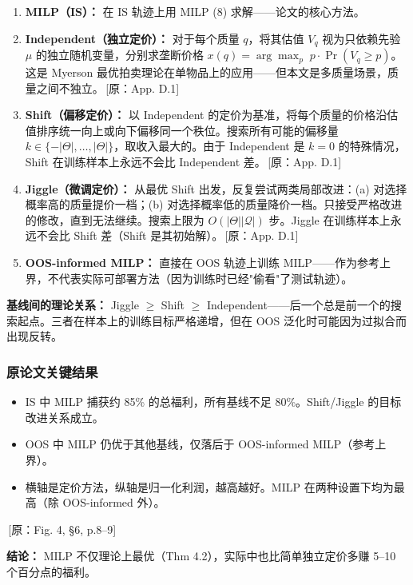 \documentclass[12pt,a4paper]{article}
\newcommand{\srcref}[1]{\textcolor{black!65}{\footnotesize\,[原：#1]}}
\theoremstyle{definition}
\begin{document}
\begin{enumerate}[leftmargin=*]
    \item \textbf{MILP（IS）：} 在 IS 轨迹上用 MILP (8) 求解——论文的核心方法。
    \item \textbf{Independent（独立定价）：} 对于每个质量 $q$，将其估值 $V_q$ 视为只依赖先验 $\mu$ 的独立随机变量，分别求垄断价格 $x(q) = \arg\max_p \; p \cdot \Pr(V_q \ge p)$。这是 Myerson 最优拍卖理论在单物品上的应用——但本文是多质量场景，质量之间不独立。\srcref{App. D.1}
    \item \textbf{Shift（偏移定价）：} 以 Independent 的定价为基准，将每个质量的价格沿估值排序统一向上或向下偏移同一个秩位。搜索所有可能的偏移量 $k \in \{-|\Theta|,\dots,|\Theta|\}$，取收入最大的。由于 Independent 是 $k=0$ 的特殊情况，Shift 在训练样本上永远不会比 Independent 差。\srcref{App. D.1}
    \item \textbf{Jiggle（微调定价）：} 从最优 Shift 出发，反复尝试两类局部改进：(a) 对选择概率高的质量提价一档；(b) 对选择概率低的质量降价一档。只接受严格改进的修改，直到无法继续。搜索上限为 $O(|\Theta||\mathcal{Q}|)$ 步。Jiggle 在训练样本上永远不会比 Shift 差（Shift 是其初始解）。\srcref{App. D.1}
    \item \textbf{OOS-informed MILP：} 直接在 OOS 轨迹上训练 MILP——作为参考上界，不代表实际可部署方法（因为训练时已经"偷看"了测试轨迹）。
\end{enumerate}

\textbf{基线间的理论关系：} Jiggle $\ge$ Shift $\ge$ Independent——后一个总是前一个的搜索起点。三者在样本上的训练目标严格递增，但在 OOS 泛化时可能因为过拟合而出现反转。

\subsubsection{原论文关键结果}

\begin{itemize}[leftmargin=*]
    \item IS 中 MILP 捕获约 85\% 的总福利，所有基线不足 80\%。Shift/Jiggle 的目标改进关系成立。
    \item OOS 中 MILP 仍优于其他基线，仅落后于 OOS-informed MILP（参考上界）。
    \item 横轴是定价方法，纵轴是归一化利润，越高越好。MILP 在两种设置下均为最高（除 OOS-informed 外）。
\end{itemize}
\srcref{Fig. 4, §6, p.8--9}

\textbf{结论：} MILP 不仅理论上最优（Thm 4.2），实际中也比简单独立定价多赚 5--10 个百分点的福利。
\end{document}
